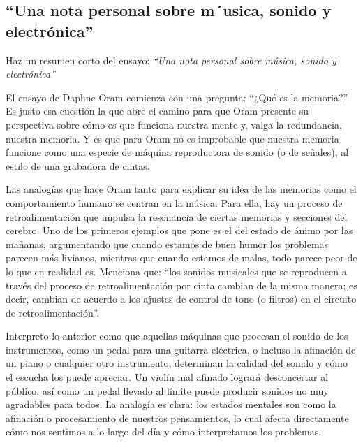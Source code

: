 \newpage

\begin{myblock}
\section*{``Una nota personal sobre m´usica, sonido y
electrónica''}

Haz un resumen corto del ensayo: \textit{``Una nota personal sobre música, sonido y electrónica''}

\end{myblock}


El ensayo de Daphne Oram comienza con una pregunta: ``¿Qué es la memoria?'' Es justo esa cuestión la
que abre el camino para que Oram presente su perspectiva sobre cómo es que funciona nuestra mente y, 
valga la redundancia, nuestra memoria. Y es que para Oram no es improbable que nuestra memoria funcione
como una especie de máquina reproductora de sonido (o de señales), al estilo de una grabadora de cintas. 

Las analogías que hace Oram tanto para explicar su idea de las memorias como el comportamiento humano se
centran en la música. Para ella, hay un proceso de retroalimentación que impulsa la resonancia de ciertas
memorias y secciones del cerebro. Uno de los primeros ejemplos que pone es el del estado de ánimo por las 
mañanas, argumentando que cuando estamos de buen humor los problemas parecen más livianos, mientras que
cuando estamos de malas, todo parece peor de lo que en realidad es. Menciona que: ``los sonidos musicales
que se reproducen a través del proceso de retroalimentación por cinta cambian de la misma manera; es decir, 
cambian de acuerdo a los ajustes de control de tono (o filtros) en el circuito de retroalimentación''. 

Interpreto lo anterior como que aquellas máquinas que procesan el sonido de los instrumentos, como un pedal 
para una guitarra eléctrica, o incluso la afinación de un piano o cualquier otro instrumento, determinan
la calidad del sonido y cómo el escucha los puede apreciar. Un violín mal afinado logrará desconcertar al 
público, así como un pedal llevado al límite puede producir sonidos no muy agradables para todos. La analogía 
es clara: los estados mentales son como la afinación o procesamiento de nuestros pensamientos, lo cual afecta 
directamente cómo nos sentimos a lo largo del día y cómo interpretamos los problemas. 

